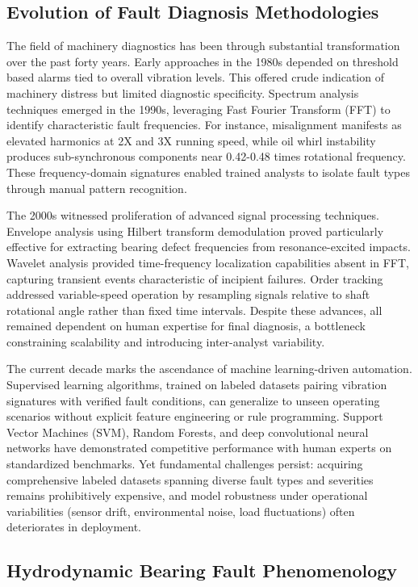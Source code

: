 \documentclass[11pt,a4paper]{article}
\begin{document}
\subsection{Evolution of Fault Diagnosis Methodologies}

The field of machinery diagnostics has been through substantial transformation over the past forty years. Early approaches in the 1980s depended on threshold based alarms tied to overall vibration levels. This offered crude indication of machinery distress but limited diagnostic specificity. Spectrum analysis techniques emerged in the 1990s, leveraging Fast Fourier Transform (FFT) to identify characteristic fault frequencies. For instance, misalignment manifests as elevated harmonics at 2X and 3X running speed, while oil whirl instability produces sub-synchronous components near 0.42-0.48 times rotational frequency. These frequency-domain signatures enabled trained analysts to isolate fault types through manual pattern recognition.

The 2000s witnessed proliferation of advanced signal processing techniques. Envelope analysis using Hilbert transform demodulation proved particularly effective for extracting bearing defect frequencies from resonance-excited impacts. Wavelet analysis provided time-frequency localization capabilities absent in FFT, capturing transient events characteristic of incipient failures. Order tracking addressed variable-speed operation by resampling signals relative to shaft rotational angle rather than fixed time intervals. Despite these advances, all remained dependent on human expertise for final diagnosis, a bottleneck constraining scalability and introducing inter-analyst variability.

The current decade marks the ascendance of machine learning-driven automation. Supervised learning algorithms, trained on labeled datasets pairing vibration signatures with verified fault conditions, can generalize to unseen operating scenarios without explicit feature engineering or rule programming. Support Vector Machines (SVM), Random Forests, and deep convolutional neural networks have demonstrated competitive performance with human experts on standardized benchmarks. Yet fundamental challenges persist: acquiring comprehensive labeled datasets spanning diverse fault types and severities remains prohibitively expensive, and model robustness under operational variabilities (sensor drift, environmental noise, load fluctuations) often deteriorates in deployment.

\subsection{Hydrodynamic Bearing Fault Phenomenology}
\end{document}
